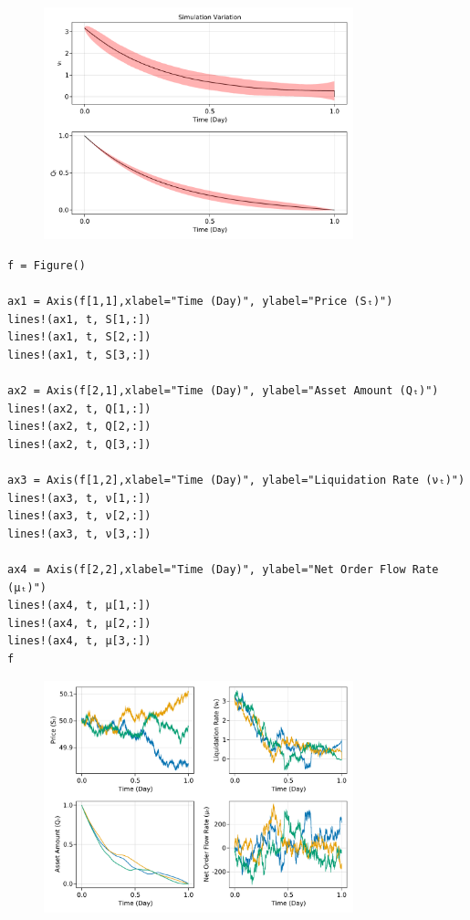 \begin{figure}[H]
	\centering
	\includegraphics[width=0.8\textwidth]{./figures/Trabalho1_figure1.pdf}
	\label{fig:Trabalho1_figure1}

\end{figure}

\begin{lstlisting}[language=JuliaLocal, style=julia]
f = Figure()

ax1 = Axis(f[1,1],xlabel="Time (Day)", ylabel="Price (Sₜ)")
lines!(ax1, t, S[1,:])
lines!(ax1, t, S[2,:])
lines!(ax1, t, S[3,:])

ax2 = Axis(f[2,1],xlabel="Time (Day)", ylabel="Asset Amount (Qₜ)")
lines!(ax2, t, Q[1,:])
lines!(ax2, t, Q[2,:])
lines!(ax2, t, Q[3,:])

ax3 = Axis(f[1,2],xlabel="Time (Day)", ylabel="Liquidation Rate (νₜ)")
lines!(ax3, t, ν[1,:])
lines!(ax3, t, ν[2,:])
lines!(ax3, t, ν[3,:])

ax4 = Axis(f[2,2],xlabel="Time (Day)", ylabel="Net Order Flow Rate (μₜ)")
lines!(ax4, t, μ[1,:])
lines!(ax4, t, μ[2,:])
lines!(ax4, t, μ[3,:])
f
\end{lstlisting}

\begin{figure}[H]
	\centering
	\includegraphics[width=0.8\textwidth]{./figures/Trabalho1_figure2.pdf}
	\label{fig:Trabalho1_figure2}

\end{figure}
